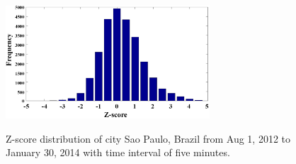\begin{figure}[h]
	\centering
    {
		\includegraphics[width=3in] {figures/Z-Score-distribution.png}
		\label{fig:distribution}
	}
	\caption{ Z-score distribution of city Sao Paulo, Brazil from Aug 1, 2012 to January 30, 2014 with time interval of five minutes. }
	\label{fig:zscore-distribution}
\end{figure}
